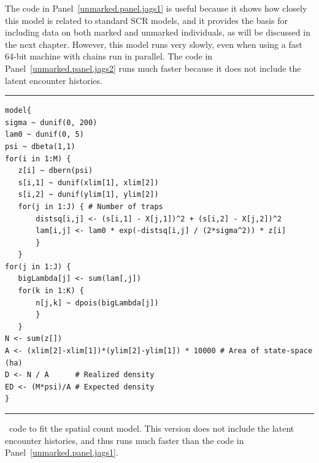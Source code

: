 The code in Panel~\ref{unmarked.panel.jags1} %
is useful because it shows how
closely this model is related to standard SCR models, and it provides
the basis for including data on both marked and unmarked individuals,
as will be discussed in the next chapter. However, this model runs
very slowly, even when using a fast 64-bit machine with chains run in parallel. The code
in Panel~\ref{unmarked.panel.jags2} runs much faster because it
does not include the latent encounter histories. %

\begin{panel}
\centering
\rule[0.05in]{\textwidth}{.03in}
\begin{small}
\begin{verbatim}
model{
sigma ~ dunif(0, 200)
lam0 ~ dunif(0, 5)
psi ~ dbeta(1,1)
for(i in 1:M) {
   z[i] ~ dbern(psi)
   s[i,1] ~ dunif(xlim[1], xlim[2])
   s[i,2] ~ dunif(ylim[1], ylim[2])
   for(j in 1:J) { # Number of traps
       distsq[i,j] <- (s[i,1] - X[j,1])^2 + (s[i,2] - X[j,2])^2
       lam[i,j] <- lam0 * exp(-distsq[i,j] / (2*sigma^2)) * z[i]
       }
   }
for(j in 1:J) {
   bigLambda[j] <- sum(lam[,j])
   for(k in 1:K) {
       n[j,k] ~ dpois(bigLambda[j])
       }
   }
N <- sum(z[])
A <- (xlim[2]-xlim[1])*(ylim[2]-ylim[1]) * 10000 # Area of state-space (ha)
D <- N / A      # Realized density
ED <- (M*psi)/A # Expected density
}
\end{verbatim}
\end{small}
\rule[0.15in]{\textwidth}{.03in}
\caption{\jags~code to fit the spatial count model. This version
  does not include the latent encounter histories, and thus runs much
  faster than the code in Panel~\ref{unmarked.panel.jags1}.}
\label{unmarked.panel.jags2}
\end{panel}



